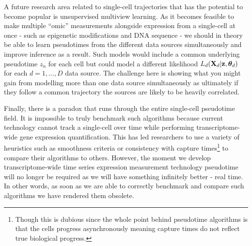 A future research area related to single-cell trajectories that has the potential to become popular is unsupervised multiview learning. As it becomes feasible to make multiple ``omic'' measurements alongside expression from a single-cell at once - such as epigenetic modifications and DNA sequence - we should in theory be able to learn pseudotimes from the different data sources simultaneously and improve inference as a result. Such models would include a common underlying pseudotime $z_n$ for each cell but could model a different likelihood $L_d(\mathbf{X}_d | \mathbf{z}, \bm{\theta}_d)$ for each $d = 1, \ldots, D$ data source. The challenge here is showing what you might gain from modelling more than one data source simultaneously as ultimately if they follow a common trajectory the sources are likely to be heavily correlated.

Finally, there is a paradox that runs through the entire single-cell pseudotime field. It is impossible to truly benchmark such algorithms because current technology cannot track a single-cell over time while performing transcriptome-wide gene expression quantification. This has led researchers to use a variety of heuristics such as smoothness criteria or consistency with capture times\footnote{
    Though this is dubious since the whole point behind pseudotime algorithms is that the cells progress asynchronously meaning capture times do not reflect true biological progress.
} to compare their algorithms to others. However, the moment we develop transcriptome-wide time series expression measurement technology pseudotime will no longer be required as we will have something infinitely better - real time. In other words, as soon as we are able to correctly benchmark and compare such algorithms we have rendered them obsolete.

